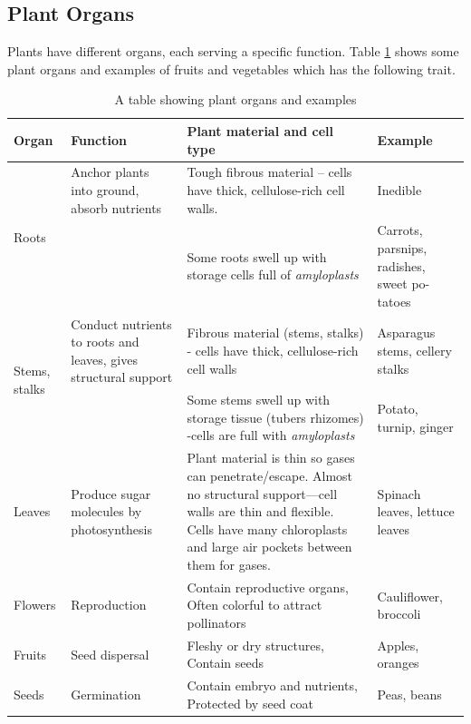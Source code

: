 \subsection*{Plant Organs}
Plants have different organs, each serving a specific function. Table \ref{tab:L01_plant_organs} shows some plant organs and examples of fruits and vegetables which has the following trait.
\begin{table}[h]
    \centering
    \caption{A table showing plant organs and examples}
    \label{tab:L01_plant_organs}
    \begin{tabular}{|p{1.9cm}|p{3cm}|p{6cm}|p{3cm}|}
    \hline
    \textbf{Organ} & \textbf{Function} & \textbf{Plant material and cell type} & \textbf{Example} \\
    \hline
    \multirow{2}{3cm}{Roots} & Anchor plants into ground, absorb nutrients & Tough fibrous material -- cells have thick, cellulose-rich cell walls.  & Inedible \\
    \cline{3-4}
    & & Some roots swell up with storage cells full of \textit{amyloplasts} & Carrots, parsnips, radishes, sweet po-tatoes \\
    \hline
    \multirow{2}{3cm}{Stems, stalks} & Conduct nutrients to roots and leaves, gives structural support & Fibrous material (stems, stalks) - cells have thick, cellulose-rich cell walls & Asparagus stems, cellery stalks \\
    \cline{1-1} \cline{3-4}
    Tubers, rhizomes & & Some stems swell up with storage tissue (tubers rhizomes) -cells are full with \textit{amyloplasts} & Potato, turnip, ginger \\
    \hline
    Leaves & Produce sugar molecules by photosynthesis & Plant material is thin so gases can penetrate/escape. Almost no structural support—cell walls are thin and flexible. Cells have many chloroplasts and large air pockets between them for gases. & Spinach leaves, lettuce leaves \\
    \hline
    Flowers & Reproduction & Contain reproductive organs, Often colorful to attract pollinators & Cauliflower, broccoli \\
    \hline
    Fruits & Seed dispersal & Fleshy or dry structures, Contain seeds & Apples, oranges \\
    \hline
    Seeds & Germination & Contain embryo and nutrients, Protected by seed coat & Peas, beans \\
    \hline
    \end{tabular}
\end{table}

